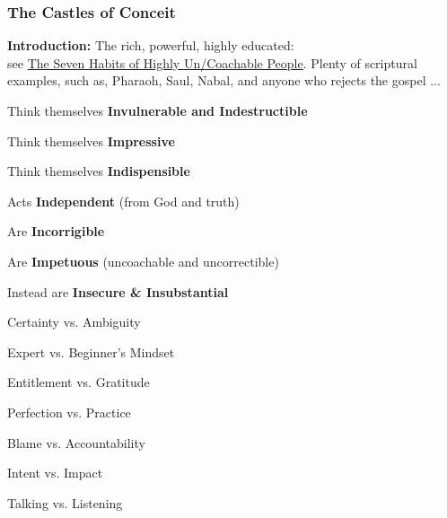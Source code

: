 \subsubsection{The Castles of Conceit}
\textbf{Introduction: } The rich, powerful, highly educated: \\
see \href{https://www.skywardcoaching.com/single-post/2016/07/13/the-seven-habits-of-highly-uncoachable-people}{The Seven Habits of Highly Un/Coachable People}. Plenty of scriptural examples, such as, Pharaoh, Saul, Nabal, and anyone who rejects the gospel ...
\begin{compactenum}[I.][7]
    \item Think themselves \textbf{Invulnerable and Indestructible} %
    \item Think themselves \textbf{Impressive}
    \item Think themselves \textbf{Indispensible}
    \item Acts \textbf{Independent} (from God and truth)
    \item Are \textbf{Incorrigible}
    \item Are \textbf{Impetuous} (uncoachable and uncorrectible)
    \item Instead are \textbf{Insecure \& Insubstantial}\\
\end{compactenum}
\begin{compactenum}[1.][7]
    \item Certainty vs. Ambiguity
    \item Expert vs. Beginner’s Mindset
    \item Entitlement vs. Gratitude
    \item Perfection vs. Practice
    \item Blame vs. Accountability
    \item Intent vs. Impact
    \item Talking vs. Listening
\end{compactenum}
